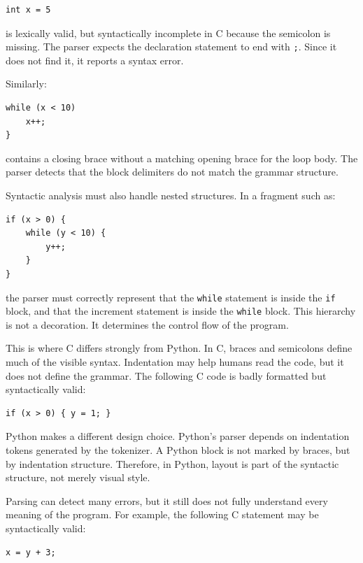 \begin{verbatim}
int x = 5
\end{verbatim}

is lexically valid, but syntactically incomplete in C because the semicolon is missing. The parser expects the declaration statement to end with \texttt{;}. Since it does not find it, it reports a syntax error.

Similarly:

\begin{verbatim}
while (x < 10)
    x++;
}
\end{verbatim}

contains a closing brace without a matching opening brace for the loop body. The parser detects that the block delimiters do not match the grammar structure.

Syntactic analysis must also handle nested structures. In a fragment such as:

\begin{verbatim}
if (x > 0) {
    while (y < 10) {
        y++;
    }
}
\end{verbatim}

the parser must correctly represent that the \texttt{while} statement is inside the \texttt{if} block, and that the increment statement is inside the \texttt{while} block. This hierarchy is not a decoration. It determines the control flow of the program.

This is where C differs strongly from Python. In C, braces and semicolons define much of the visible syntax. Indentation may help humans read the code, but it does not define the grammar. The following C code is badly formatted but syntactically valid:

\begin{verbatim}
if (x > 0) { y = 1; }
\end{verbatim}

Python makes a different design choice. Python's parser depends on indentation tokens generated by the tokenizer. A Python block is not marked by braces, but by indentation structure. Therefore, in Python, layout is part of the syntactic structure, not merely visual style.

Parsing can detect many errors, but it still does not fully understand every meaning of the program. For example, the following C statement may be syntactically valid:

\begin{verbatim}
x = y + 3;
\end{verbatim}

